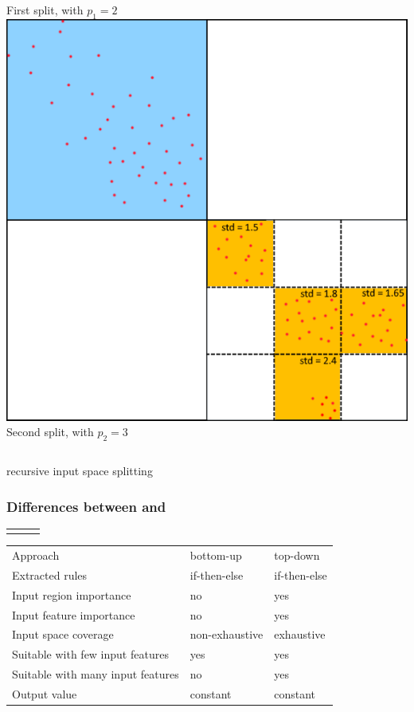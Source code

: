 \documentclass[presentation]{beamer}
\begin{document}
\begin{frame}
\begin{columns}[t]
			\scriptsize First split, with $p_1=2$
			\centering
			\includegraphics[width = \columnwidth]{img/demo/3.pdf}\\
			\scriptsize Second split, with $p_2=3$
	\end{columns}
	\centering
	\vspace{10px} \gridex recursive input space splitting
\end{frame}

\begin{frame}
\frametitle{Differences between \iter and \gridex}
	\begin{block}{
		\begin{tabular}{p{}p{}p{}}
			& \iter & \gridex
		\end{tabular}
	}
		\begin{tabular}{p{}p{}p{}}
			Approach & bottom-up & top-down \\
			Extracted rules & if-then-else & if-then-else \\
			Input region importance & no & yes \\
			Input feature importance & no & yes \\
			Input space coverage & non-exhaustive & exhaustive \\
			Suitable with few input features & yes & yes \\
			Suitable with many input features & no & yes \\
			Output value & constant & constant 
		\end{tabular}
	\end{block}
\end{frame}
\end{document}

